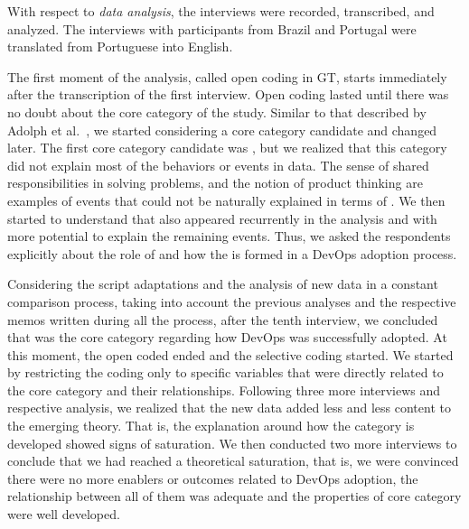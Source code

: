 With respect to \emph{data analysis}, the interviews were
recorded, transcribed, and analyzed. The interviews with participants from
Brazil and Portugal were translated from Portuguese into
English.

The first moment of the analysis, called open coding in GT, starts
immediately after the transcription of the first interview.
Open coding lasted until there was no
doubt about the core category of the study. Similar to that described by
Adolph et al.~\cite{adolph2012reconciling}, we started
considering a core category candidate and changed later. The first core category
candidate was , but we realized that this category did not
explain most of the behaviors or events in data. The sense of
shared responsibilities in solving problems, and the notion of product thinking
are examples of events that could not be naturally explained in terms of .
We then started to understand that \cc also appeared recurrently in the analysis
and with more potential to explain the remaining events. Thus, we asked the
respondents explicitly about the role of  and how the \cc is
formed in a DevOps adoption process.

Considering the script adaptations and the analysis of new data in a constant
comparison process, taking into account the previous analyses and the
respective memos written during all the process, after the tenth
interview, we concluded that \cc was the core
category regarding how DevOps was successfully adopted.
At this moment, the open coded ended and the selective coding started.
We started by restricting the coding only
to specific variables that were directly related to the core category and their
relationships. Following three more interviews and respective analysis, we realized that
the new data added less and less content to the emerging theory. That is, the
explanation around how the \cc category is developed showed signs of saturation.
We then conducted two more interviews to conclude that we had reached a
theoretical saturation, that is, we were convinced there were no more enablers
or outcomes related to DevOps adoption, the relationship between all of them
was adequate and the properties of core category were well developed.


